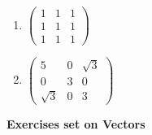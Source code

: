 \documentclass[fleqn]{article}
\begin{document}
\begin{enumerate}
\begin{enumerate}
    \item  $\left( 
    \begin{array}{rrr}
    1 & 1 & 1 \\ 
    1 & 1 & 1 \\ 
    1 & 1 & 1
    \end{array}
    \right) $
    
    \item  $\left( 
    \begin{array}{rrr}
    5 & 0 & \sqrt{3} \\ 
    0 & 3 & 0 \\ 
    \sqrt{3} & 0 & 3
    \end{array}
    \right) $
    \end{enumerate}
    

\end{enumerate}

\pagebreak

\textbf{Exercises set on Vectors}
\end{document}
